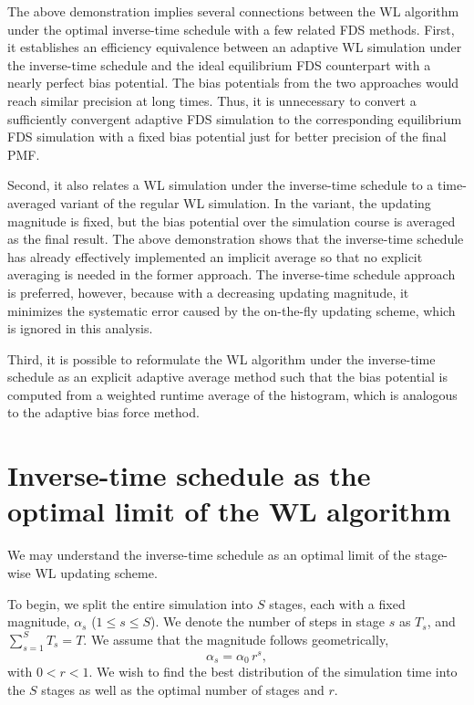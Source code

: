 \documentclass[reprint, superscriptaddress, floatfix]{revtex4-1}
\begin{document}
The above demonstration implies several connections
between the WL algorithm under the optimal inverse-time schedule
with a few related FDS methods.
%
First,
it establishes an efficiency equivalence
between an adaptive WL simulation under the inverse-time schedule
and the ideal equilibrium FDS counterpart
with a nearly perfect bias potential.
%
The bias potentials from the two approaches
would reach similar precision at long times.
%
Thus, it is unnecessary to convert
a sufficiently convergent adaptive FDS simulation
to the corresponding equilibrium FDS simulation
with a fixed bias potential just for better precision
of the final PMF.

Second,
it also relates a WL simulation under the inverse-time schedule
to a time-averaged variant of the regular WL simulation.
%
In the variant, the updating magnitude is fixed,
but the bias potential over the simulation course is averaged
as the final result\cite{zhou2005}.
%
The above demonstration shows that the inverse-time schedule
has already effectively implemented an implicit average
so that no explicit averaging is needed in the former approach.
%
The inverse-time schedule approach is preferred, however,
because with a decreasing updating magnitude,
it minimizes the systematic error caused by
the on-the-fly updating scheme\cite{
  zhou2005, zhou2008},
which is ignored in this analysis.

Third,
it is possible to reformulate the WL algorithm
under the inverse-time schedule
as an explicit adaptive average method
such that the bias potential is computed from
a weighted runtime average of the histogram\cite{
  marsili2006, barducci2008},
which is analogous to the adaptive bias force method\cite{
  darve2001, *darve2008}.



\section{\label{sec:wltoinvt}
Inverse-time schedule as the optimal limit of the WL algorithm}


We may understand the inverse-time schedule %
as an optimal limit of the stage-wise WL updating scheme.
%

To begin, we split the entire simulation into $S$ stages,
each with a fixed magnitude, $\alpha_s$ ($1 \le s \le S$).
%
We denote the number of steps in stage $s$ as $T_s$, and
$\sum_{s=1}^S T_s = T$.
%
%
We assume that
the magnitude follows geometrically,
%
\begin{equation}
  \alpha_s = \alpha_0 \, r^s
  ,
  \label{eq:alphas}
\end{equation}
%
with $0 < r < 1$.
%
%
We wish to find the best distribution of the simulation time
into the $S$ stages
as well as
the optimal number of stages and $r$.
\end{document}
